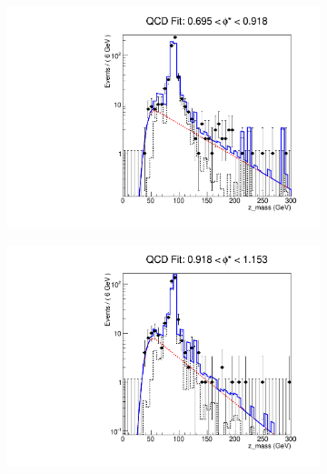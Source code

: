 \begin{figure}[!htbp]
    \centering
    \begin{subfigure}[b]{0.5\textwidth}
        \includegraphics[width=\linewidth]{figures/qcd_fits/qcd_fit_plot_for_29.pdf}
        \caption{}
        \label{fig:qcd_fit_29}
    \end{subfigure}%
    \begin{subfigure}[b]{0.5\textwidth}
        \includegraphics[width=\linewidth]{figures/qcd_fits/qcd_fit_plot_for_30.pdf}
        \caption{}
        \label{fig:qcd_fit_30}
    \end{subfigure}
    \begin{subfigure}[b]{0.5\textwidth}

\end{subfigure}
\end{figure}
